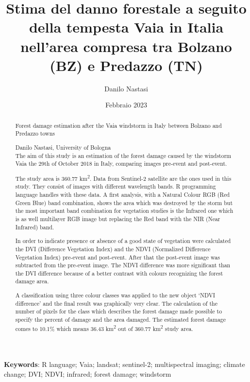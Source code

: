 \documentclass[a4paper,12pt]{article}
\title{Stima del danno forestale a seguito della tempesta Vaia in Italia nell'area compresa tra Bolzano (BZ) e Predazzo (TN)}
\author{Danilo Nastasi}
\date{Febbraio 2023}
\begin{document}
\maketitle
\tableofcontents

\newpage

\begin{abstract}
\noindent Forest damage estimation after the Vaia windstorm in Italy between Bolzano and Predazzo towns

\noindent Danilo Nastasi, University of Bologna \\

The aim of this study is an estimation of the forest damage caused by the windstorm Vaia the 29th of October 2018 in Italy, comparing images pre-event and post-event.

\noindent The study area is 360.77 km\textsuperscript{2}. Data from Sentinel-2 satellite are the ones used in this study. They consist of images with different wavelength bands. R programming language handles with these data. A first analysis, with a Natural Colour RGB (Red Green Blue) band combination, shows the area which was destroyed by the storm but the most important band combination for vegetation studies  is the Infrared one which is as well multilayer RGB image but replacing the Red band with the NIR (Near Infrared) band.

\noindent In order to indicate presence or absence of a good state of vegetation were calculated the DVI (Difference Vegetation Index) and the NDVI (Normalized Difference Vegetation Index) pre-event and post-event. After that the post-event image was subtracted from the pre-event image. The NDVI difference was more significant than the DVI difference because of a better contrast with colours recognizing the forest damage area.

\noindent A classification using three colour classes was applied to the new object ‘NDVI difference’  and the final result was graphically very clear. The calculation of the number of pixels for the class which describes the forest damage made possible to specify the percent of damage and the area damaged. The estimated forest damage comes to 10.1\% which means 36.43 km\textsuperscript{2} out of 360.77 km\textsuperscript{2} study area.

\end{abstract}

\noindent \textbf{Keywords}: R language; Vaia; landsat; sentinel-2; multispectral imaging; climate change; DVI; NDVI; infrared; forest damage; windstorm
\end{document}
